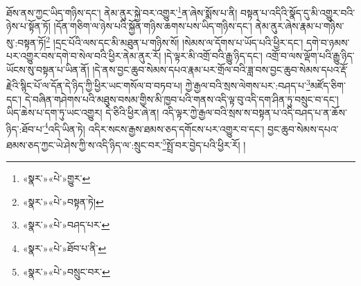 ཐོས་ནས་ཀྱང་ཡིད་གཉིས་དང་། ནེམ་ནུར་སྐྱེ་བར་འགྱུར་\footnote{«སྣར་»«པེ་»གྱུར་}ན་ཞེས་སྨོས་པ་ནི། བསྟན་པ་འདིའི་སྣོད་དུ་མི་འགྱུར་བའི་ཉེས་པ་སྟོན་ཏོ། །དོན་གཅིག་ལ་ཉེས་པའི་སྐྱོན་གཉིས་ཆགས་པས་ཡིད་གཉིས་དང་། ནེམ་ནུར་ཞེས་རྣམ་པ་གཉིས་སུ་:བསྟན་ཏོ།\footnote{«སྣར་»«པེ་»བསྟན་ཏེ།} །དྲང་པོའི་ལས་དང་མི་མཐུན་པ་གཉིས་སོ། །སེམས་ལ་དོགས་པ་ཡོད་པའི་ཕྱིར་དང་། དགེ་བ་ཉམས་པར་འགྱུར་བས་དགེ་བ་སེལ་བའི་ཕྱིར་ནེམ་ནུར་རོ། །དེ་ལྟར་མི་འགྲོ་བའི་རྒྱུ་ཉིད་དང་། འགྲོ་བ་ལས་ལྡོག་པའི་རྒྱུ་ཉིད་ཡོངས་སུ་བསྟན་པ་ཡིན་ནོ། །དེ་ནས་བྱང་ཆུབ་སེམས་དཔའ་རྣམ་པར་གྲོལ་བའི་ཟླ་བས་བྱང་ཆུབ་སེམས་དཔའ་རྡོ་རྗེའི་སྙིང་པོ་ལ་དོན་དེ་ཉིད་ཀྱི་ཕྱིར་ཡང་གསོལ་བ་བཏབ་པ། ཀྱེ་རྒྱལ་བའི་སྲས་ལེགས་པར་:བཤད་པ་\footnote{«སྣར་»«པེ་»བཤད་པར་}མཛོད་ཅིག་དང་། དེ་བཞིན་གཤེགས་པའི་མཐུས་བསམ་གྱིས་མི་ཁྱབ་པའི་གནས་འདི་ལྟ་བུ་འདི་དག་ཤིན་ཏུ་བསྲུང་བ་དང་། ཡིད་ཆེས་པ་དག་ཏུ་ཡང་འགྱུར། དེ་ཅིའི་ཕྱིར་ཞེ་ན། འདི་ལྟར་ཀྱེ་རྒྱལ་བའི་སྲས་ས་བསྟན་པ་འདི་བཤད་པ་ན་ཆོས་ཉིད་:ཐོབ་པ་\footnote{«སྣར་»«པེ་»ཐོབ་པ་ནི་}འདི་ཡིན་ཏེ། འདིར་སངས་རྒྱས་ཐམས་ཅད་དགོངས་པར་འགྱུར་བ་དང་། བྱང་ཆུབ་སེམས་དཔའ་ཐམས་ཅད་ཀྱང་ཡེ་ཤེས་ཀྱི་ས་འདི་ཉིད་ལ་:སྲུང་བར་\footnote{«སྣར་»«པེ་»བསྲུང་བར་}སྤྲོ་བར་བྱེད་པའི་ཕྱིར་རོ། །
